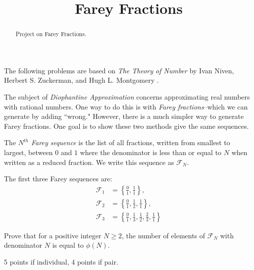 \documentclass[letterpaper, 11 pt]{ximera}
\title{Farey Fractions}
\begin{document}
\begin{abstract}
 Project on Farey Fractions.
\end{abstract}
\maketitle

The following problems are based on \emph{The Theory of Number} by Ivan Niven, Herbert S. Zuckerman, and Hugh L. Montgomery \cite{niven-zuckerman-montgomery}.

The subject of \emph{Diophantine Approximation} concerns approximating real numbers with rational numbers.  One way to do this is with \emph{Farey fractions}--which we can generate by adding ``wrong." However, there is a much simpler way to generate Farey fractions. One goal is to show these two methods give the same sequences.

\begin{exploration}
 \begin{definition}
 The \emph{$N^{th}$ Farey sequence} is the list of all fractions, written from smallest to largest, between $0$ and $1$ where the denominator is less than or equal to $N$ when written as a reduced fraction. We write this sequence as $\mathcal{F}_N$.
\end{definition}

The first three Farey sequences are:
\begin{align*}
    \mathcal{F}_1 &= \left\{\frac 01, \frac 11 \right\}, \\
    \mathcal{F}_2 &= \left\{ \frac 01, \frac 12, \frac 11 \right\}, \\
    \mathcal{F}_3 &= \left\{ \frac 01, \frac 13, \frac 12, \frac 23, \frac 11 \right\}
    \end{align*}


\begin{problem}
	Prove that for a positive integer $N\geq 2$, the number of elements of $\mathcal{F}_N$ with denominator $N$ is equal to $\phi(N)$.
\begin{rubric}
5 points if individual, 4 points if pair.
\end{rubric}
\end{problem}
\end{exploration}
\end{document}

